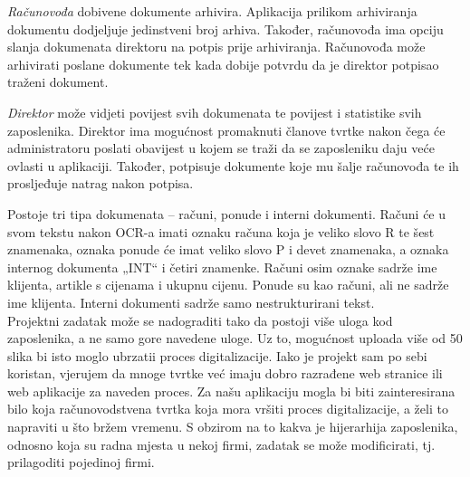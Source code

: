 		\textit{Računovođa} dobivene dokumente arhivira. Aplikacija prilikom arhiviranja	dokumentu dodjeljuje jedinstveni broj arhiva. Također, računovođa ima opciju slanja dokumenata direktoru na potpis prije arhiviranja. Računovođa može arhivirati poslane dokumente tek kada dobije potvrdu da je direktor potpisao traženi dokument.
		
		\textit {Direktor} može vidjeti povijest svih dokumenata te povijest i	statistike svih zaposlenika. Direktor ima mogućnost promaknuti članove tvrtke nakon čega će administratoru poslati obavijest u kojem se traži da se zaposleniku daju veće ovlasti u aplikaciji. Također, potpisuje dokumente koje mu šalje računovođa te ih prosljeđuje natrag nakon potpisa.
		
		Postoje tri tipa dokumenata – računi, ponude i interni dokumenti. Računi će u
		svom tekstu nakon OCR-a imati oznaku računa koja je veliko slovo R te šest znamenaka, oznaka ponude će imat veliko slovo P i devet znamenaka, a oznaka internog dokumenta
		„INT“ i četiri znamenke. Računi osim oznake sadrže ime klijenta, artikle s cijenama i
		ukupnu cijenu. Ponude su kao računi, ali ne sadrže ime klijenta. Interni dokumenti
		sadrže samo nestrukturirani tekst.\\
		
		Projektni zadatak može se nadograditi tako da postoji više uloga kod zaposlenika, a ne samo gore navedene uloge. Uz to, mogućnost uploada više od 50 slika bi isto moglo ubrzatii proces digitalizacije. Iako je projekt sam po sebi koristan, vjerujem da mnoge tvrtke već imaju dobro razrađene web stranice ili web aplikacije za naveden proces. Za našu aplikaciju mogla bi biti zainteresirana bilo koja računovodstvena tvrtka koja mora vršiti proces digitalizacije, a želi to napraviti u što bržem vremenu. S obzirom na to kakva je hijerarhija zaposlenika, odnosno koja su radna mjesta u nekoj firmi, zadatak se može modificirati, tj. prilagoditi pojedinoj firmi.
		
		\eject
		
	
	
